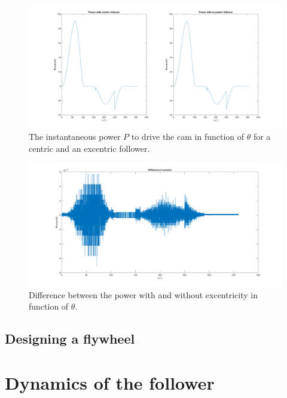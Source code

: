 \documentclass[a4paper]{article}
\begin{document}
\begin{figure}
	\centering
	\includegraphics[width=\textwidth]{powerplot.png}
	\caption{The instantaneous power \(P\) to drive the cam in function of \(\theta\) for a centric and an excentric follower.}
	\label{fig:powerplot}
	
\end{figure}

\begin{figure}
	\centering
	\includegraphics[width=\textwidth]{diffpower.png}
	\caption{Difference between the power with and without excentricity in function of \(\theta\).}
	\label{diffpower}
\end{figure}

\subsection{Designing a flywheel}

\section{Dynamics of the follower}



\end{document}
